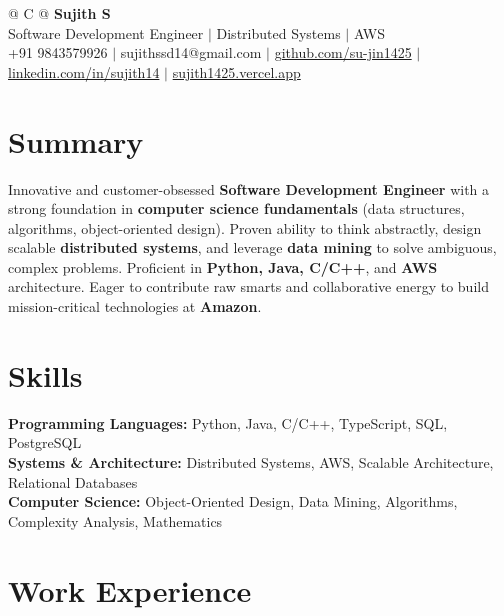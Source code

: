 \documentclass[a4paper,10pt]{article}
\newcommand{\ulink}[2]{\href{#1}{#2}}
\begin{document}
\pagestyle{empty}

\begin{tabularx}{\linewidth}{@{} C @{}}
{\color[HTML]{000000}\fontsize{30}{35}\selectfont\bfseries Sujith S} \\[5pt]
{\fontsize{10.5}{12.5}\selectfont\color[HTML]{3A3A3A}
Software Development Engineer $|$ Distributed Systems $|$ AWS} \\[6pt]
{\fontsize{9.5}{11.5}\selectfont\textcolor[HTML]{3A3A3A}{+91 9843579926 $|$ sujithssd14@gmail.com $|$ \ulink{https://github.com/su-jin1425}{github.com/su-jin1425} $|$ \ulink{https://linkedin.com/in/sujith14}{linkedin.com/in/sujith14} $|$ \ulink{https://sujith1425.vercel.app}{sujith1425.vercel.app}}}
\end{tabularx}

\section{Summary}
\vspace{2pt}

{\color[HTML]{0A0A0A}\fontsize{11}{14}\selectfont
Innovative and customer-obsessed \textbf{Software Development Engineer} with a strong foundation in \textbf{computer science fundamentals} (data structures, algorithms, object-oriented design). Proven ability to think abstractly, design scalable \textbf{distributed systems}, and leverage \textbf{data mining} to solve ambiguous, complex problems. Proficient in \textbf{Python, Java, C/C++}, and \textbf{AWS} architecture. Eager to contribute raw smarts and collaborative energy to build mission-critical technologies at \textbf{Amazon}.}

\section{Skills}
\vspace{2pt}

{\color[HTML]{0A0A0A}\fontsize{11}{14}\selectfont
\textbf{Programming Languages:} Python, Java, C/C++, TypeScript, SQL, PostgreSQL \\[2pt]
\textbf{Systems \& Architecture:} Distributed Systems, AWS, Scalable Architecture, Relational Databases \\[2pt]
\textbf{Computer Science:} Object-Oriented Design, Data Mining, Algorithms, Complexity Analysis, Mathematics}

\section{Work Experience}
\vspace{2pt}
\end{document}

